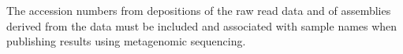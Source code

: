 \documentclass[graybox]{svmult}
\begin{document}
The accession numbers from depositions of the raw read data and of assemblies derived from the data must be included and associated with sample names when publishing results using metagenomic sequencing.  




%


%
%

% 


\end{document}
